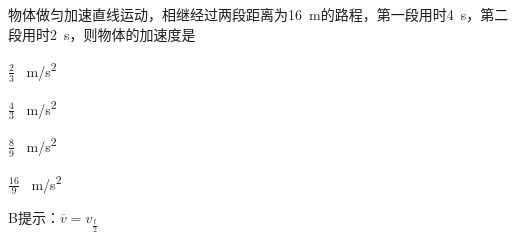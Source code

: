 物体做匀加速直线运动，相继经过两段距离为\qty{16}{m}的路程，第一段用时\qty{4}{s}，第二段用时\qty{2}{s}，则物体的加速度是\paren[B]
\begin{choices}
    \item \(\frac{2}{3}\) \qty{}{m/s^2}
    \item \(\frac{4}{3}\) \qty{}{m/s^2}
    \item \(\frac{8}{9}\) \qty{}{m/s^2}
    \item \(\frac{16}{9}\) \qty{}{m/s^2}
\end{choices}
\begin{answer}
    B\qquad 提示：\(\overline{v} = v_{\frac{t}{2}}\)
\end{answer}